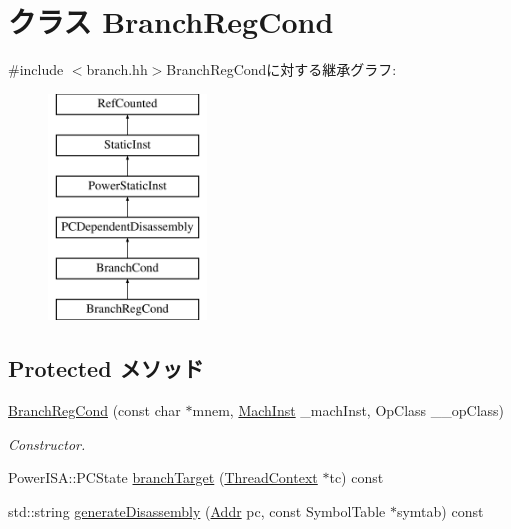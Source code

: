 \hypertarget{classPowerISA_1_1BranchRegCond}{
\section{クラス BranchRegCond}
\label{classPowerISA_1_1BranchRegCond}
}


{\ttfamily \#include $<$branch.hh$>$}BranchRegCondに対する継承グラフ:\begin{figure}[H]
\begin{center}
\leavevmode
\includegraphics[height=6cm]{classPowerISA_1_1BranchRegCond}
\end{center}
\end{figure}
\subsection*{Protected メソッド}
\begin{DoxyCompactItemize}
\item 
\hyperlink{classPowerISA_1_1BranchRegCond_a65f92ac725cc9dfcf11226bd01830405}{BranchRegCond} (const char $\ast$mnem, \hyperlink{namespacePowerISA_a301c22ea09fa33dcfe6ddf22f203699c}{MachInst} \_\-machInst, OpClass \_\-\_\-opClass)
\begin{DoxyCompactList}\small\item\em Constructor. \item\end{DoxyCompactList}\item 
PowerISA::PCState \hyperlink{classPowerISA_1_1BranchRegCond_a22dbdbb7032b55b56b13139ebe091dfe}{branchTarget} (\hyperlink{classThreadContext}{ThreadContext} $\ast$tc) const 
\item 
std::string \hyperlink{classPowerISA_1_1BranchRegCond_a95d323a22a5f07e14d6b4c9385a91896}{generateDisassembly} (\hyperlink{base_2types_8hh_af1bb03d6a4ee096394a6749f0a169232}{Addr} pc, const SymbolTable $\ast$symtab) const 
\end{DoxyCompactItemize}


